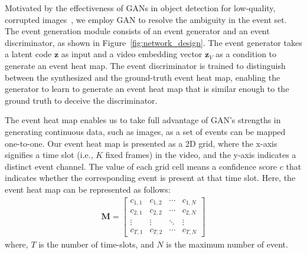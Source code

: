 Motivated by the effectiveness of GANs in object detection for low-quality, corrupted images~\cite{Li2017-ga,Prakash2021-oy}, we employ GAN to resolve the ambiguity in the event set.
The event generation module consists of an event generator and an event discriminator, as shown in Figure~\ref{fig:network_design}.
The event generator takes a latent code $\bm{z}$ as input and a video embedding vector $\bm{z}_V$ as a condition to generate an event heat map.
The event discriminator is trained to distinguish between the synthesized and the ground-truth event heat map, enabling the generator to learn to generate an event heat map that is similar enough to the ground truth to deceive the discriminator.

The event heat map enables us to take full advantage of GAN's strengths in generating continuous data, such as images, as a set of events can be mapped one-to-one.
Our event heat map is presented as a 2D grid, where the x-axis signifies a time slot (i.e., $K$ fixed frames) in the video, and the y-axis indicates a distinct event channel.
The value of each grid cell means a confidence score $c$ that indicates whether the corresponding event is present at that time slot.
Here, the event heat map can be represented as follows:
\begin{equation}
    \begin{aligned}
        \bm{M} = \begin{bmatrix}
            c_{1,1} & c_{1,2} & \cdots & c_{1,N} \\
            c_{2,1} & c_{2,2} & \cdots & c_{2,N} \\
            \vdots & \vdots & \ddots & \vdots \\
            c_{T,1} & c_{T,2} & \cdots & c_{T,N}
        \end{bmatrix}
    \end{aligned}
\end{equation}
where, $T$ is the number of time-slots, and $N$ is the maximum number of event.

